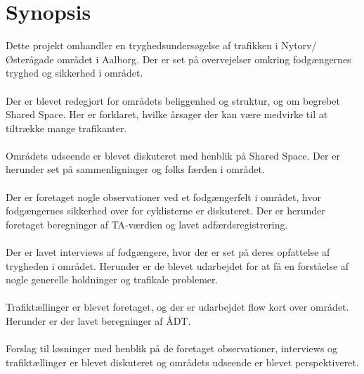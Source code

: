 \section{Synopsis}
\label{sec:synopsis}
Dette projekt omhandler en tryghedsundersøgelse af trafikken i Nytorv/Østerågade området i Aalborg. Der er set på overvejelser omkring fodgængernes tryghed og sikkerhed i området.
\\\\
Der er blevet redegjort for områdets beliggenhed og struktur, og om begrebet Shared Space. Her er forklaret, hvilke årsager der kan være medvirke til at tiltrække mange trafikanter.
\\\\
Områdets udseende er blevet diskuteret med henblik på Shared Space. Der er herunder set på sammenligninger og folks færden i området.
\\\\
Der er foretaget nogle observationer ved et fodgængerfelt i området, hvor fodgængernes sikkerhed over for cyklisterne er diskuteret. Der er herunder foretaget beregninger af TA-værdien og lavet adfærdsregistrering.
\\\\
Der er lavet interviews af fodgængere, hvor der er set på deres opfattelse af trygheden i området. Herunder er de blevet udarbejdet for at få en forståelse af nogle generelle holdninger og trafikale problemer.
\\\\
Trafiktællinger er blevet foretaget, og der er udarbejdet flow kort over området. Herunder er der lavet beregninger af ÅDT.
\\\\
Forslag til løsninger med henblik på de foretaget observationer, interviews og trafiktællinger er blevet diskuteret og områdets udseende er blevet perspektiveret.
